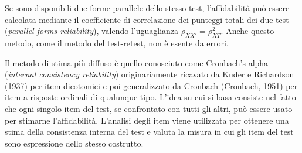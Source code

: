 Se sono disponibili due forme parallele dello stesso test, l'affidabilità può essere calcolata mediante il coefficiente di correlazione dei punteggi totali dei due test (\emph{parallel-forms reliability}), valendo l'uguaglianza $\rho_{XX'} = \rho^2_{XT}$. Anche questo metodo, come il metodo del test-retest, non è esente da errori. 

Il metodo di stima più diffuso è quello conosciuto come Cronbach’s alpha (\emph{internal consistency reliability}) originariamente ricavato da Kuder e Richardson (1937) per item dicotomici e poi generalizzato da Cronbach (Cronbach, 1951) per item a risposte ordinali di qualunque tipo. L'idea su cui si basa consiste nel fatto che ogni singolo item del test, se confrontato con tutti gli altri, può essere usato per stimarne l'affidabilità. L'analisi degli item viene utilizzata per ottenere una stima della consistenza interna del test e valuta la misura in cui gli item del test sono espressione dello stesso costrutto.


